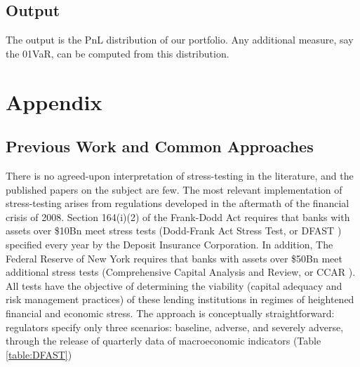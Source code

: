 \documentclass[letter, 12pt]{article}
\begin{document}
\subsection{Output}

The output is the PnL distribution of our portfolio. Any additional measure, say the 01VaR, can be computed from this distribution.



\section{Appendix}
\subsection{Previous Work and Common Approaches}

There is no agreed-upon interpretation of stress-testing in the literature, and the published papers on the subject are few. The most relevant implementation of stress-testing arises from regulations developed in the aftermath of the financial crisis of 2008. Section 164(i)(2) of the Frank-Dodd Act requires that banks with assets over \$10Bn meet stress tests (Dodd-Frank Act Stress Test, or DFAST \cite{fed2013}) specified every year by the Deposit Insurance Corporation. In addition, The Federal Reserve of New York requires that banks with assets over \$50Bn meet additional stress tests (Comprehensive Capital Analysis and Review, or CCAR \cite{fed2017, fed2018}). All tests have the objective of determining the viability (capital adequacy and risk management practices) of these lending institutions in regimes of heightened financial and economic stress. The approach is conceptually straightforward: regulators specify only three scenarios: baseline, adverse, and severely adverse, through the release of quarterly data of macroeconomic indicators (Table \ref{table:DFAST})
\end{document}
